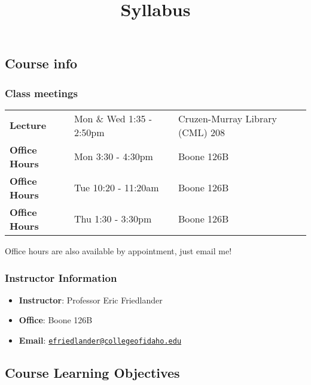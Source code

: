 \documentclass[
  letterpaper,
  DIV=11,
  numbers=noendperiod]{scrartcl}
\title{Syllabus}
\author{}
\date{}
\providecommand{\tightlist}{%
  \setlength{\itemsep}{0pt}\setlength{\parskip}{0pt}}
\begin{document}
\maketitle


\subsection{Course info}\label{course-info}

\subsubsection{Class meetings}\label{class-meetings}

\begin{longtable}[]{@{}
  >{\raggedright\arraybackslash}p{}
  >{\raggedright\arraybackslash}p{}
  >{\raggedright\arraybackslash}p{}@{}}
\toprule\noalign{}
\endhead
\bottomrule\noalign{}
\endlastfoot
\textbf{Lecture} & Mon \& Wed 1:35 - 2:50pm & Cruzen-Murray Library
(CML) 208 \\
\textbf{Office Hours} & Mon 3:30 - 4:30pm & Boone 126B \\
\textbf{Office Hours} & Tue 10:20 - 11:20am & Boone 126B \\
\textbf{Office Hours} & Thu 1:30 - 3:30pm & Boone 126B \\
\end{longtable}

Office hours are also available by appointment, just email me!

\subsubsection{Instructor Information}\label{instructor-information}

\begin{itemize}
\tightlist
\item
  \textbf{Instructor}: Professor Eric Friedlander
\item
  \textbf{Office}: Boone 126B
\item
  \textbf{Email}:
  \href{mailto:efriedlander@collegeofidaho.edu}{\nolinkurl{efriedlander@collegeofidaho.edu}}
\end{itemize}

\subsection{Course Learning
Objectives}\label{course-learning-objectives}
\end{document}
